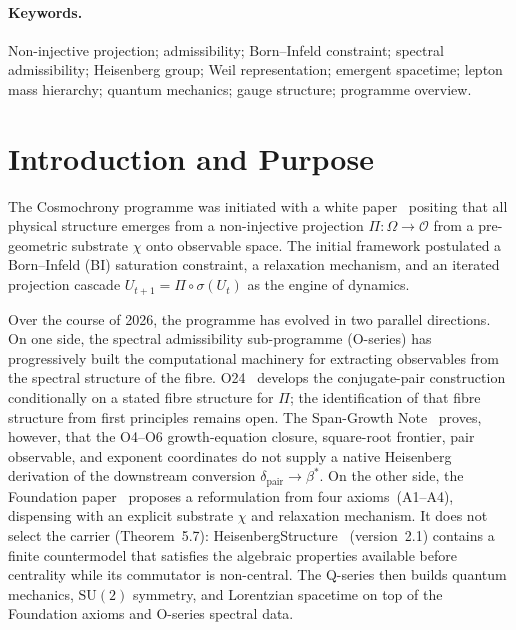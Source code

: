 \documentclass[11pt,a4paper]{article}
\newcommand{\SU}{\mathrm{SU}}
\begin{document}
  \paragraph{Keywords.}
    Non-injective projection; admissibility; Born--Infeld constraint; spectral admissibility;
    Heisenberg group; Weil representation; emergent spacetime; lepton mass hierarchy;
    quantum mechanics; gauge structure; programme overview.

    \clearpage

    \setcounter{tocdepth}{2}
    \tableofcontents

    \clearpage

  \section{Introduction and Purpose}

  The Cosmochrony programme was initiated with a white paper~\cite{Cosmochrony} positing that
  all physical structure emerges from a non-injective projection $\Pi : \Omega \to \mathcal{O}$
  from a pre-geometric substrate $\chi$ onto observable space.
  The initial framework postulated a Born--Infeld (BI) saturation constraint, a relaxation mechanism,
  and an iterated projection cascade $U_{t+1} = \Pi \circ \sigma(U_t)$ as the engine of dynamics.

  Over the course of 2026, the programme has evolved in two parallel directions.
  On one side, the spectral admissibility sub-programme (O-series) has progressively built the
  computational machinery for extracting observables from the spectral structure of the fibre.
  O24~\cite{Beau2026a28} develops the conjugate-pair construction conditionally on a stated
  fibre structure for $\Pi$; the identification of that fibre structure from first principles
  remains open.
  The Span-Growth Note~\cite{Beau2026sgn} proves, however, that the O4--O6 growth-equation closure,
  square-root frontier, pair observable, and exponent coordinates do not supply a native
  Heisenberg derivation of the downstream conversion $\delta_{\mathrm{pair}} \to \beta^*$.
  On the other side, the Foundation paper~\cite{Beau2026m} proposes a reformulation from
  four axioms~(A1--A4), dispensing with an explicit substrate $\chi$ and relaxation mechanism.
  It does not select the carrier (Theorem~5.7):
  HeisenbergStructure~\cite{Beau2026HeisenbergStructure} (version~2.1) contains a finite countermodel that
  satisfies the algebraic properties available before centrality while its commutator is non-central.
  The Q-series then builds quantum mechanics, $\SU(2)$ symmetry, and Lorentzian spacetime
  on top of the Foundation axioms and O-series spectral data.
\end{document}
